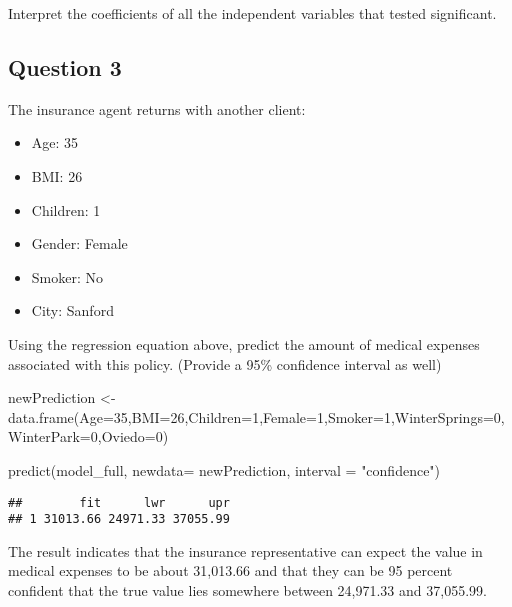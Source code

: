 \documentclass[
]{article}
\newenvironment{Shaded}{\begin{snugshade}}{\end{snugshade}}
\newcommand{\AttributeTok}[1]{\textcolor[rgb]{0.77,0.63,0.00}{#1}}
\newcommand{\DecValTok}[1]{\textcolor[rgb]{0.00,0.00,0.81}{#1}}
\newcommand{\FunctionTok}[1]{\textcolor[rgb]{0.00,0.00,0.00}{#1}}
\newcommand{\NormalTok}[1]{#1}
\newcommand{\OtherTok}[1]{\textcolor[rgb]{0.56,0.35,0.01}{#1}}
\newcommand{\StringTok}[1]{\textcolor[rgb]{0.31,0.60,0.02}{#1}}
\providecommand{\tightlist}{%
  \setlength{\itemsep}{0pt}\setlength{\parskip}{0pt}}
\begin{document}
Interpret the coefficients of all the independent variables that tested
significant.

\hypertarget{question-3}{%
\subsection{Question 3}\label{question-3}}

The insurance agent returns with another client:

\begin{itemize}
\tightlist
\item
  Age: 35
\item
  BMI: 26
\item
  Children: 1
\item
  Gender: Female
\item
  Smoker: No
\item
  City: Sanford
\end{itemize}

Using the regression equation above, predict the amount of medical
expenses associated with this policy. (Provide a 95\% confidence
interval as well)

\begin{Shaded}
\begin{Highlighting}[]
\NormalTok{newPrediction }\OtherTok{\textless{}{-}} \FunctionTok{data.frame}\NormalTok{(}\AttributeTok{Age=}\DecValTok{35}\NormalTok{,}\AttributeTok{BMI=}\DecValTok{26}\NormalTok{,}\AttributeTok{Children=}\DecValTok{1}\NormalTok{,}\AttributeTok{Female=}\DecValTok{1}\NormalTok{,}\AttributeTok{Smoker=}\DecValTok{1}\NormalTok{,}\AttributeTok{WinterSprings=}\DecValTok{0}\NormalTok{,}\AttributeTok{WinterPark=}\DecValTok{0}\NormalTok{,}\AttributeTok{Oviedo=}\DecValTok{0}\NormalTok{)}

\FunctionTok{predict}\NormalTok{(model\_full, }\AttributeTok{newdata=}\NormalTok{ newPrediction, }\AttributeTok{interval =} \StringTok{"confidence"}\NormalTok{)}
\end{Highlighting}
\end{Shaded}

\begin{verbatim}
##        fit      lwr      upr
## 1 31013.66 24971.33 37055.99
\end{verbatim}

The result indicates that the insurance representative can expect the
value in medical expenses to be about 31,013.66 and that they can be 95
percent confident that the true value lies somewhere between 24,971.33
and 37,055.99.
\end{document}
